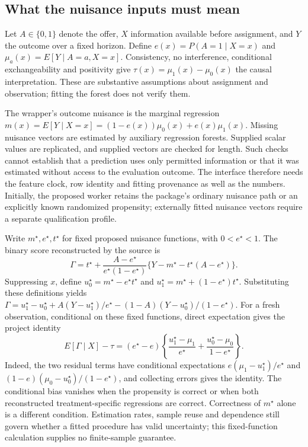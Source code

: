 \subsection{What the nuisance inputs must mean}
\label{exec21:grfr-nuisance}
Let $A\in\{0,1\}$ denote the offer, $X$ information available before assignment, and $Y$ the outcome over a fixed horizon. Define $e(x)=P(A=1\mid X=x)$ and $\mu_a(x)=E[Y\mid A=a,X=x]$. Consistency, no interference, conditional exchangeability and positivity give $\tau(x)=\mu_1(x)-\mu_0(x)$ the causal interpretation. These are substantive assumptions about assignment and observation; fitting the forest does not verify them.

The wrapper's outcome nuisance is the marginal regression $m(x)=E[Y\mid X=x]=(1-e(x))\mu_0(x)+e(x)\mu_1(x)$. Missing nuisance vectors are estimated by auxiliary regression forests. Supplied scalar values are replicated, and supplied vectors are checked for length. Such checks cannot establish that a prediction uses only permitted information or that it was estimated without access to the evaluation outcome. The interface therefore needs the feature clock, row identity and fitting provenance as well as the numbers. Initially, the proposed worker retains the package's ordinary nuisance path or an explicitly known randomized propensity; externally fitted nuisance vectors require a separate qualification profile.~\citep{exec21_grf_reuse}

Write $m^\star,e^\star,t^\star$ for fixed proposed nuisance functions, with $0<e^\star<1$. The binary score reconstructed by the source is
\begin{equation}
 \Gamma=t^\star+\frac{A-e^\star}{e^\star(1-e^\star)}
       \{Y-m^\star-t^\star(A-e^\star)\}.
 \label{exec21:grfr-score}
\end{equation}
Suppressing $x$, define $u_0^\star=m^\star-e^\star t^\star$ and
$u_1^\star=m^\star+(1-e^\star)t^\star$. Substituting these definitions yields
$\Gamma=u_1^\star-u_0^\star+A(Y-u_1^\star)/e^\star
-(1-A)(Y-u_0^\star)/(1-e^\star)$. For a fresh observation, conditional on these fixed functions, direct expectation gives the project identity
\begin{equation}
 E[\Gamma\mid X]-\tau
 =(e^\star-e)\left\{\frac{u_1^\star-\mu_1}{e^\star}
                   +\frac{u_0^\star-\mu_0}{1-e^\star}\right\}.
 \label{exec21:grfr-bias}
\end{equation}
Indeed, the two residual terms have conditional expectations
$e(\mu_1-u_1^\star)/e^\star$ and
$(1-e)(\mu_0-u_0^\star)/(1-e^\star)$, and collecting errors gives the identity. The conditional bias vanishes when the propensity is correct or when both reconstructed treatment-specific regressions are correct. Correctness of $m^\star$ alone is a different condition. Estimation rates, sample reuse and dependence still govern whether a fitted procedure has valid uncertainty; this fixed-function calculation supplies no finite-sample guarantee.~\citep{exec21_grf_reuse,exec21_grf_reference}

